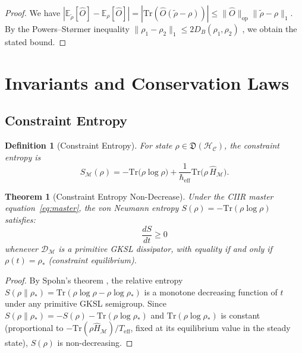 \documentclass[twocolumn,aps,prd,superscriptaddress,nofootinbib]{revtex4-2}
\newtheorem{theorem}{Theorem}[section]
\newtheorem{definition}{Definition}[section]
\newcommand{\HC}{\mathcal{H}_{\mathcal{C}}}
\newcommand{\CM}{\mathcal{M}}
\newcommand{\CD}{\mathcal{D}}
\newcommand{\hatH}{\hat{H}}
\newcommand{\hatO}{\hat{O}}
\newcommand{\Tr}{\mathrm{Tr}}
\begin{document}
\begin{proof}
We have $|\mathbb{E}_{\tilde\rho}[\hatO]-\mathbb{E}_\rho[\hatO]| = |\Tr(\hatO(\tilde\rho-\rho))|
\leq \|\hatO\|_{\mathrm{op}}\|\tilde\rho-\rho\|_1$.
By the Powers--St{\o}rmer inequality $\|\rho_1-\rho_2\|_1 \leq 2D_B(\rho_1,\rho_2)$ \cite{Fuchs1999}, we obtain the stated bound.
\end{proof}

\section{Invariants and Conservation Laws}
\label{sec:invariants}

\subsection{Constraint Entropy}

\begin{definition}[Constraint Entropy]
\label{def:centropy}
For state $\rho \in \mathfrak{D}(\HC)$, the \emph{constraint entropy} is
\begin{equation}
  S_\CM(\rho) = -\Tr\bigl(\rho \log \rho\bigr)
    + \frac{1}{\hbar_\mathrm{eff}}\Tr\bigl(\rho\, \hatH_\CM\bigr).
  \label{eq:centropy}
\end{equation}
\end{definition}

\begin{theorem}[Constraint Entropy Non-Decrease]
\label{thm:entropy}
Under the CIIR master equation~\eqref{eq:master}, the von Neumann entropy
$S(\rho) = -\Tr(\rho\log\rho)$ satisfies:
\begin{equation}
  \frac{dS}{dt} \geq 0
  \label{eq:entropy_increase}
\end{equation}
whenever $\CD_\CM$ is a primitive GKSL dissipator, with equality if and only
if $\rho(t) = \rho_*$ (constraint equilibrium).
\end{theorem}

\begin{proof}
By Spohn's theorem \cite{Spohn1977}, the relative entropy
$S(\rho\|\rho_*) = \Tr(\rho\log\rho - \rho\log\rho_*)$ is a monotone
decreasing function of $t$ under any primitive GKSL semigroup.  Since
$S(\rho\|\rho_*) = -S(\rho) - \Tr(\rho\log\rho_*)$ and $\Tr(\rho\log\rho_*)$
is constant (proportional to $-\Tr(\rho\hatH_\CM)/T_\mathrm{eff}$, fixed at
its equilibrium value in the steady state), $S(\rho)$ is non-decreasing.
\end{proof}
\end{document}
